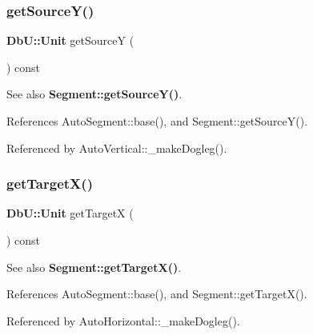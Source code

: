 \mbox{\label{classKatabatic_1_1AutoSegment_ae913463a76d08b079611a993cebea1a9}} 
\subsubsection{\texorpdfstring{get\+Source\+Y()}{getSourceY()}}
{\footnotesize\ttfamily \textbf{ Db\+U\+::\+Unit} get\+SourceY (\begin{DoxyParamCaption}{ }\end{DoxyParamCaption}) const\hspace{0.3cm}{\ttfamily [inline]}}

\begin{DoxySeeAlso}{See also}
\textbf{ Segment\+::get\+Source\+Y()}. 
\end{DoxySeeAlso}


References Auto\+Segment\+::base(), and Segment\+::get\+Source\+Y().



Referenced by Auto\+Vertical\+::\+\_\+make\+Dogleg().

\mbox{\label{classKatabatic_1_1AutoSegment_a8e6462b43ca9eaeea1e08866cec59a8c}} 
\subsubsection{\texorpdfstring{get\+Target\+X()}{getTargetX()}}
{\footnotesize\ttfamily \textbf{ Db\+U\+::\+Unit} get\+TargetX (\begin{DoxyParamCaption}{ }\end{DoxyParamCaption}) const\hspace{0.3cm}{\ttfamily [inline]}}

\begin{DoxySeeAlso}{See also}
\textbf{ Segment\+::get\+Target\+X()}. 
\end{DoxySeeAlso}


References Auto\+Segment\+::base(), and Segment\+::get\+Target\+X().



Referenced by Auto\+Horizontal\+::\+\_\+make\+Dogleg().

